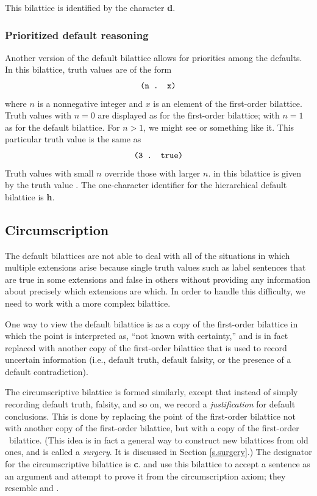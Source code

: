 This bilattice is identified by the character {\bf d}.

\subsubsection{Prioritized default reasoning}

Another version of the default bilattice allows for priorities among
the defaults.  In this bilattice, truth values are of the form
 \[\mbox{\tt (n . x)}\]
 where $n$ is a nonnegative integer and $x$ is an element of the
first-order bilattice.  Truth values with $n=0$ are displayed as for
the first-order bilattice; with $n=1$ as for the default bilattice.
For $n>1$, we might see  or something like it.  This
particular truth value is the same as
 \[\mbox{\tt (3 . true)}\]
 Truth values with small $n$ override those with larger $n$.
 in this bilattice is given by the truth value \NIL.
The one-character identifier for the hierarchical default bilattice is
{\bf h}.

\subsection{Circumscription} 
\label{s.circ}

The default bilattices are not able to deal with all of the
situations in which multiple extensions arise because single truth
values such as \type{*} label sentences that are true in some
extensions and false in others without providing any information
about precisely which extensions are which.  In order to handle this
difficulty, we need to work with a more complex bilattice.

One way to view the default bilattice is as a copy of the first-order
bilattice in which the point  is interpreted as, ``not
known with certainty,'' and is in fact replaced with another copy of
the first-order bilattice that is used to record uncertain
information (i.e., default truth, default falsity, or the presence of
a default contradiction).

The circumscriptive bilattice is formed similarly, except that
instead of simply recording default truth, falsity, and so on, we
record a {\em justification\/} for default conclusions.  This is done
by replacing the point  of the first-order bilattice
not with another copy of the first-order bilattice, but with a copy
of the first-order \atms\ bilattice.  (This idea is in fact a general
way to construct new bilattices from old ones, and is called a {\em
surgery}.  It is discussed in Section \ref{s.surgery}.)  The
designator for the circumscriptive bilattice is {\bf c}.
 and  use this bilattice to accept a
sentence as an argument and attempt to prove it from the
circumscription axiom; they resemble  and .

